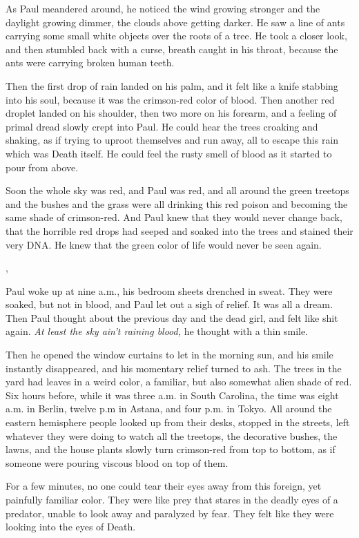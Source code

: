 \documentclass[openany, oneside]{book}
\begin{document}
As Paul meandered around, he noticed the wind growing stronger and the daylight growing dimmer, the clouds above getting darker.
He saw a line of ants carrying some small white objects over the roots of a tree.
He took a closer look, and then stumbled back with a curse, breath caught in his throat, because the ants were carrying broken human teeth.

Then the first drop of rain landed on his palm, and it felt like a knife stabbing into his soul, because it was the crimson-red color of blood.
Then another red droplet landed on his shoulder, then two more on his forearm, and a feeling of primal dread slowly crept into Paul.
He could hear the trees croaking and shaking, as if trying to uproot themselves and run away, all to escape this rain which was Death itself.
He could feel the rusty smell of blood as it started to pour from above.

Soon the whole sky was red, and Paul was red, and all around the green treetops and the bushes and the grass were all drinking this red poison and becoming the same shade of crimson-red.
And Paul knew that they would never change back, that the horrible red drops had seeped and soaked into the trees and stained their very DNA.
He knew that the green color of life would never be seen again.

\sep

Paul woke up at nine a.m., his bedroom sheets drenched in sweat.
They were soaked, but not in blood, and Paul let out a sigh of relief.
It was all a dream.
Then Paul thought about the previous day and the dead girl, and felt like shit again.
\emph{At least the sky ain't raining blood,} he thought with a thin smile.

Then he opened the window curtains to let in the morning sun, and his smile instantly disappeared, and his momentary relief turned to ash.
The trees in the yard had leaves in a weird color, a familiar, but also somewhat alien shade of red.\\

Six hours before, while it was three a.m. in South Carolina, the time was eight a.m. in Berlin, twelve p.m in Astana, and four p.m. in Tokyo.
All around the eastern hemisphere people looked up from their desks, stopped in the streets, left whatever they were doing to watch all the treetops, the decorative bushes, the lawns, and the house plants slowly turn crimson-red from top to bottom, as if someone were pouring viscous blood on top of them.

For a few minutes, no one could tear their eyes away from this foreign, yet painfully familiar color.
They were like prey that stares in the deadly eyes of a predator, unable to look away and paralyzed by fear. They felt like they were looking into the eyes of Death.\\
\end{document}
